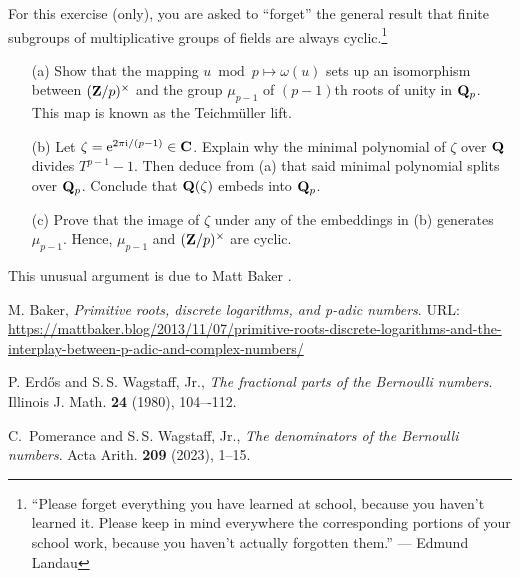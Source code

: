 \begin{challenge} For this exercise (only), you are asked to ``forget'' the general result that finite subgroups of multiplicative groups of fields are always cyclic.\footnote{``Please forget everything you have learned at school, because you haven't learned it. Please keep in mind everywhere the corresponding portions of your school work, because you haven't actually forgotten them.'' --- Edmund Landau}
\begin{enumerate}
\vspace{-0.12in}
\item[(a)] Show that the mapping $u \bmod{p}\mapsto \omega(u)$ sets up an isomorphism between $(\mathbf{Z}/p)^{\times}$ and the group $\mu_{p-1}$ of $(p-1)$th roots of unity in $\mathbf{Q}_p$. This map is known as the \textsf{Teichm\"{u}ller lift}.
\item[(b)] Let $\zeta = \mathrm{e}^{2\pi \mathrm{i}/(p-1)} \in \mathbf{C}$. Explain why the minimal polynomial of $\zeta$ over $\mathbf{Q}$ divides $T^{p-1}-1$. Then deduce from (a) that said minimal polynomial splits over $\mathbf{Q}_p$. Conclude that $\mathbf{Q}(\zeta)$ embeds into $\mathbf{Q}_p$.
\item[(c)] Prove that the image of $\zeta$ under any of the embeddings in (b) generates $\mu_{p-1}$. Hence, $\mu_{p-1}$ and $(\mathbf{Z}/p)^{\times}$ are cyclic.
\end{enumerate}
\vspace{-0.11in}
This unusual argument is due to Matt Baker \cite{baker}.
\end{challenge}


\let\oldaddcontentsline\addcontentsline
\renewcommand{\addcontentsline}[3]{}
\begin{thebibliography}{11}

M. Baker, \emph{Primitive roots, discrete logarithms, and p-adic numbers}. URL: \url{https://mattbaker.blog/2013/11/07/primitive-roots-discrete-logarithms-and-the-interplay-between-p-adic-and-complex-numbers/}

 P. Erd\H{o}s and S.\,S. Wagstaff, Jr., \emph{The fractional parts of the Bernoulli numbers}. Illinois J. Math. \textbf{24} (1980), 104–-112.

 C.~Pomerance and S.\,S. Wagstaff, Jr., \emph{The denominators of the Bernoulli numbers}. Acta Arith. \textbf{209} (2023), 1--15.
\end{thebibliography}
\let\addcontentsline\oldaddcontentsline


